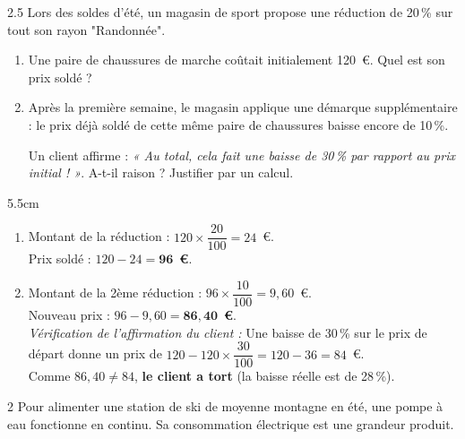 \documentclass[a4paper]{book}
\begin{document}
{    
    \begin{exerciceNote}{2.5}
        Lors des soldes d'été, un magasin de sport propose une réduction de 20\,\% sur tout son rayon "Randonnée". 
        \begin{enumerate}
            \item Une paire de chaussures de marche coûtait initialement 120~\euro. Quel est son prix soldé ?
            \item Après la première semaine, le magasin applique une démarque supplémentaire : le prix déjà soldé de cette même paire de chaussures baisse encore de 10\,\%. 
            
            Un client affirme : \textit{« Au total, cela fait une baisse de 30\,\% par rapport au prix initial ! »}. A-t-il raison ? Justifier par un calcul.
        \end{enumerate}
        
        \begin{ZoneReponse}{5.5cm}
        \color{blue}
        \begin{enumerate}
            \item Montant de la réduction : $120 \times \dfrac{20}{100} = 24$~\euro{}. \\
            Prix soldé : $120 - 24 = \mathbf{96}$~\textbf{\euro{}}.
            \item Montant de la 2ème réduction : $96 \times \dfrac{10}{100} = 9{,}60$~\euro{}. \\
            Nouveau prix : $96 - 9{,}60 = \mathbf{86{,}40}$~\textbf{\euro{}}. \\
            \textit{Vérification de l'affirmation du client :} Une baisse de 30\,\% sur le prix de départ donne un prix de $120 -120 \times \dfrac{30}{100} = 120 -36 = 84$~\euro{}. \\
            Comme $86{,}40 \neq 84$, \textbf{le client a tort} (la baisse réelle est de 28\,\%).
        \end{enumerate}
        \end{ZoneReponse}
    \end{exerciceNote}
   
    
    \begin{exerciceNote}{2}
        Pour alimenter une station de ski de moyenne montagne en été, une pompe à eau fonctionne en continu. Sa consommation électrique est une grandeur produit.
        

\end{exerciceNote}}
\end{document}
